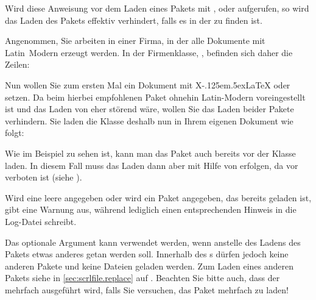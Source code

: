 \begin{Declaration}
\end{Declaration}
Wird diese Anweisung vor dem
Laden eines Pakets mit ,
 oder
aufgerufen, so wird das Laden des Pakets effektiv verhindert, falls es in
der  zu finden ist.
%
\begin{Example}
  Angenommen, Sie arbeiten in einer Firma, in der alle Dokumente mit
  Latin~Modern erzeugt werden. In der Firmenklasse, , befinden
  sich daher die Zeilen:
\begin{lstcode}
  \RequirePackage[T1]{fontenc}
  \RequirePackage{lmodern}
\end{lstcode}
  Nun wollen Sie zum ersten Mal ein Dokument mit
  X\kern-.125em\lower.5ex\hbox{}\LaTeX{} oder \LuaLaTeX{}
  setzen. Da beim hierbei empfohlenen Paket  ohnehin
  Latin-Modern voreingestellt ist und das Laden von  eher
  störend wäre, wollen Sie das Laden beider Pakete verhindern. Sie laden die
  Klasse deshalb nun in Ihrem eigenen Dokument wie folgt:
\end{Example}
Wie im Beispiel zu sehen ist, kann man das Paket  auch
bereits vor der Klasse laden. In diesem Fall muss das Laden dann aber mit
Hilfe von  erfolgen, da
 vor  verboten ist (siehe
\cite{latex:clsguide}).

Wird eine leere  angegeben oder wird ein Paket angegeben,
das bereits geladen ist, gibt  eine
Warnung aus, während
lediglich einen entsprechenden Hinweis in die Log-Datei schreibt.

Das optionale Argument kann verwendet
werden, wenn anstelle des Ladens des Pakets etwas anderes getan werden
soll. Innerhalb des s dürfen jedoch keine anderen
Pakete und keine Dateien geladen werden. Zum Laden eines anderen Pakets siehe
 in \autoref{sec:scrlfile.replace} auf
. Beachten Sie
bitte auch, dass der  mehrfach ausgeführt wird, falls
Sie versuchen, das Paket mehrfach zu laden!%
\EndIndexGroup



